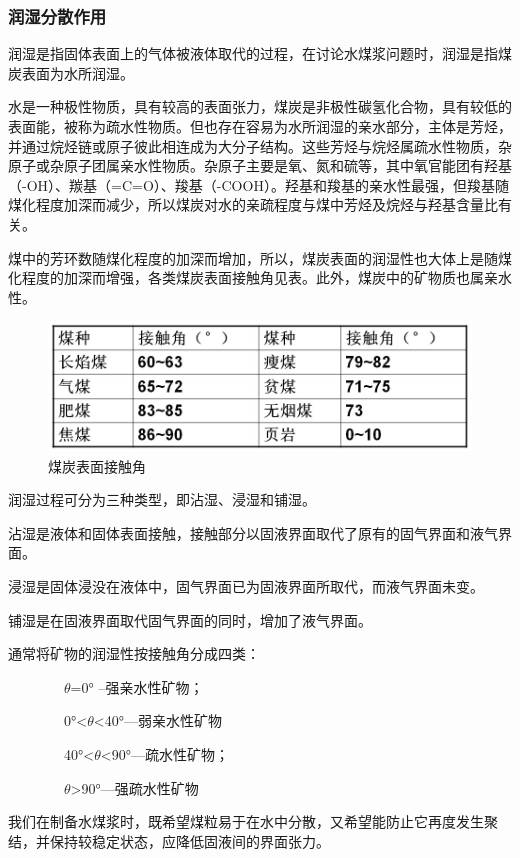 \documentclass[10pt,openany]{ctexbook}
\begin{document}
       \subsubsection{润湿分散作用}
润湿是指固体表面上的气体被液体取代的过程，在讨论水煤浆问题时，润湿是指煤炭表面为水所润湿。\par
    水是一种极性物质，具有较高的表面张力，煤炭是非极性碳氢化合物，具有较低的表面能，被称为疏水性物质。但也存在容易为水所润湿的亲水部分，主体是芳烃，并通过烷烃链或原子彼此相连成为大分子结构。这些芳烃与烷烃属疏水性物质，杂原子或杂原子团属亲水性物质。杂原子主要是氧、氮和硫等，其中氧官能团有羟基（-OH）、羰基（=C=O）、羧基（-COOH）。羟基和羧基的亲水性最强，但羧基随煤化程度加深而减少，所以煤炭对水的亲疏程度与煤中芳烃及烷烃与羟基含量比有关。\par
    煤中的芳环数随煤化程度的加深而增加，所以，煤炭表面的润湿性也大体上是随煤化程度的加深而增强，各类煤炭表面接触角见表。此外，煤炭中的矿物质也属亲水性。

     \begin{figure}[!ht]
\includegraphics[scale=0.6]{33}
\caption{煤炭表面接触角}
\end{figure}
润湿过程可分为三种类型，即沾湿、浸湿和铺湿。\par
    沾湿是液体和固体表面接触，接触部分以固液界面取代了原有的固气界面和液气界面。\par
    浸湿是固体浸没在液体中，固气界面已为固液界面所取代，而液气界面未变。\par
    铺湿是在固液界面取代固气界面的同时，增加了液气界面。\par

通常将矿物的润湿性按接触角分成四类：\par
~~~~~~~~$\theta$=0° –强亲水性矿物；\par
~~~~~~~~0°<$\theta$<40°—弱亲水性矿物\par
~~~~~~~~40°<$\theta$<90°—疏水性矿物；\par
~~~~~~~~$\theta$>90°—强疏水性矿物\par
    我们在制备水煤浆时，既希望煤粒易于在水中分散，又希望能防止它再度发生聚结，并保持较稳定状态，应降低固液间的界面张力。
\end{document}
